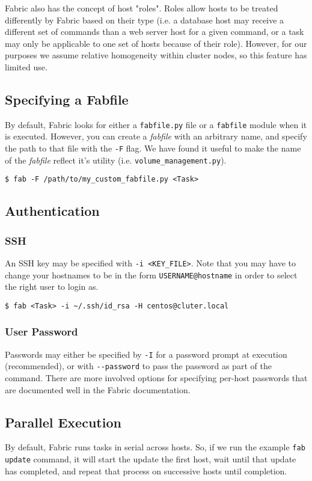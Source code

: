 \documentclass[9pt,twocolumn,twoside]{idsi}
\begin{document}
Fabric also has the concept of host "roles". Roles allow hosts to be treated differently by Fabric based on their type (i.e. a database host may receive a different set of commands than a web server host for a given command, or a task may only be applicable to one set of hosts because of their role). However, for our purposes we assume relative homogeneity within cluster nodes, so this feature has limited use.

\subsection{Specifying a Fabfile}
By default, Fabric looks for either a \texttt{fabfile.py} file or a \texttt{fabfile} module when it is executed. However, you can create a \emph{fabfile} with an arbitrary name, and specify the path to that file with the \texttt{-F} flag. We have found it useful to make the name of the \emph{fabfile} reflect it's utility (i.e. \texttt{volume\_management.py}).

\begin{verbatim}
$ fab -F /path/to/my_custom_fabfile.py <Task>
\end{verbatim}


\subsection{Authentication}
\subsubsection{SSH}
An SSH key may be specified with \texttt{-i <KEY\_FILE>}. Note that you may have to change your hostnames to be in the form \texttt{USERNAME@hostname} in order to select the right user to login as.

\begin{verbatim}
$ fab <Task> -i ~/.ssh/id_rsa -H centos@cluter.local
\end{verbatim}

\subsubsection{User Password}
Passwords may either be specified by \texttt{-I} for a password prompt at execution (recommended), or with \texttt{-\--password} to pass the password as part of the command. There are more involved options for specifying per-host passwords that are documented well in the Fabric documentation.

\subsection{Parallel Execution}
By default, Fabric runs tasks in serial across hosts. So, if we run the example \texttt{fab update} command, it will start the update the first host, wait until that update has completed, and repeat that process on successive hosts until completion.
\end{document}
